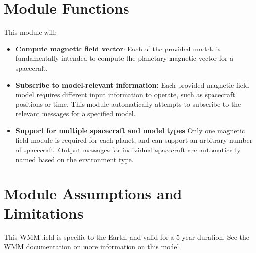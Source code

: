 

\section{Module Functions}
This module will:
\begin{itemize}
	\item \textbf{Compute magnetic field vector}: Each of the provided models is fundamentally intended to compute the planetary magnetic vector  for a spacecraft. 
	\item \textbf {Subscribe to model-relevant information:} Each provided magnetic field model requires different input information to operate, such as spacecraft positions or time. This module automatically attempts to subscribe to the relevant messages for a specified model. 
	\item \textbf{Support for multiple spacecraft and model types} Only one magnetic field module is required for each planet, and can support an arbitrary number of spacecraft. Output messages for individual spacecraft are automatically named based on the environment type.
\end{itemize}

\section{Module Assumptions and Limitations}
This WMM field is specific to the Earth, and valid for a 5 year duration.  See the WMM documentation on more information on this model.